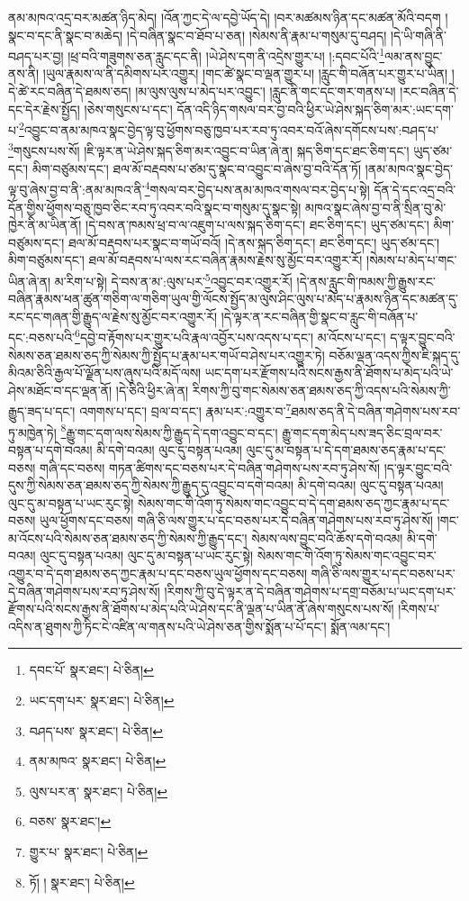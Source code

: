 ནམ་མཁའ་འདྲ་བར་མཚན་ཉིད་མེད། །འོན་ཀྱང་དེ་ལ་དབྱེ་ཡོད་དེ། །བར་མཚམས་ཉིན་དང་མཚན་མོའི་བདག །སྣང་བ་དང་ནི་སྣང་བ་མཆེད། །དེ་བཞིན་སྣང་བ་ཐོབ་པ་ཅན། །སེམས་ནི་རྣམ་པ་གསུམ་དུ་བཤད། །དེ་ཡི་གཞི་ནི་བཤད་པར་བྱ། །ཕྲ་བའི་གཟུགས་ཅན་རླུང་དང་ནི། །ཡེ་ཤེས་དག་ནི་འདྲེས་གྱུར་པ། །:དབང་པོའི་\footnote{དབང་པོ་  སྣར་ཐང་།  པེ་ཅིན། }ལམ་ནས་བྱུང་ནས་ནི། །ཡུལ་རྣམས་ལ་ནི་དམིགས་པར་འགྱུར། །གང་ཚེ་སྣང་བ་ལྡན་གྱུར་པ། །རླུང་གི་བཞོན་པར་གྱུར་པ་ཡིན། །དེ་ཚེ་རང་བཞིན་དེ་ཐམས་ཅད། །མ་ལུས་ལུས་པ་མེད་པར་འབྱུང་། །རླུང་ནི་གང་དང་གར་གནས་པ། །རང་བཞིན་དེ་དང་དེར་རྗེས་སྤྱོད། །ཅེས་གསུངས་པ་དང་། དོན་འདི་ཉིད་གསལ་བར་བྱ་བའི་ཕྱིར་ཡེ་ཤེས་སྐད་ཅིག་མར་:ཡང་དག་པ་\footnote{ཡང་དག་པར་  སྣར་ཐང་།  པེ་ཅིན། }འབྱུང་བ་ནམ་མཁའ་སྣང་བྱེད་ལྟ་བུ་ཕྱོགས་བཅུ་ཁྱབ་པར་རབ་ཏུ་འབར་བའོ་ཞེས་དགོངས་པས་:བཤད་པ་\footnote{བཤད་པས་  སྣར་ཐང་།  པེ་ཅིན། }གསུངས་པས་སོ། །ཇི་ལྟར་ན་ཡེ་ཤེས་སྐད་ཅིག་མར་འབྱུང་བ་ཡིན་ཞེ་ན། སྐད་ཅིག་དང་ཐང་ཅིག་དང་། ཡུད་ཙམ་དང་། མིག་བཙུམས་དང་། ཐལ་མོ་བརྡབས་པ་ཙམ་དུ་སྣང་བ་འབྱུང་བ་ཞེས་བྱ་བའི་དོན་ཏོ། །ནམ་མཁའ་སྣང་བྱེད་ལྟ་བུ་ཞེས་བྱ་བ་ནི་:ནམ་མཁའ་ནི་\footnote{ནམ་མཁའ་  སྣར་ཐང་།  པེ་ཅིན། }གསལ་བར་བྱེད་པས་ནམ་མཁའ་གསལ་བར་བྱེད་པ་སྟེ། དོན་དེ་དང་འདྲ་བའི་དོན་གྱིས་ཕྱོགས་བཅུ་ཁྱབ་ཅིང་རབ་ཏུ་འབར་བའི་སྣང་བ་གསུམ་དུ་སྣང་སྟེ། མཁའ་སྣང་ཞེས་བྱ་བ་ནི་སྲིན་བུ་མེ་ཁྱེར་ནི་མ་ཡིན་ནོ། །དེ་བས་ན་ཁམས་ཕྲ་བ་ལ་འཇུག་པ་ལས་སྐད་ཅིག་དང་། ཐང་ཅིག་དང་། ཡུད་ཙམ་དང་། མིག་བཙུམས་དང་། ཐལ་མོ་བརྡབས་པར་སྣང་བ་གཡོ་བའོ། །དེ་ནས་སྐད་ཅིག་དང་། ཐང་ཅིག་དང་། ཡུད་ཙམ་དང་། མིག་བཙུམས་དང་། ཐལ་མོ་བརྡབས་པ་ལས་རང་བཞིན་རྣམས་རྗེས་སུ་མྱོང་བར་འགྱུར་རོ། །སེམས་པ་མེད་པ་གང་ཡིན་ཞེ་ན། མ་རིག་པ་སྟེ། དེ་བས་ན་མ་:ལུས་པར་\footnote{ལུས་པར་ན་  སྣར་ཐང་།  པེ་ཅིན། }འབྱུང་བར་འགྱུར་རོ། །དེ་ནས་རླུང་གི་ཁམས་ཀྱི་རྒྱུས་རང་བཞིན་རྣམས་ཕན་ཚུན་གཅིག་ལ་གཅིག་ཡུལ་གྱི་ལོངས་སྤྱོད་མ་ལུས་ཤིང་ལུས་པ་མེད་པ་རྣམས་ཉིན་དང་མཚན་དུ་རང་དང་གཞན་གྱི་རྒྱུད་ལ་རྗེས་སུ་མྱོང་བར་འགྱུར་རོ། །དེ་ལྟར་ན་རང་བཞིན་གྱི་སྣང་བ་རླུང་གི་བཞོན་པ་དང་:བཅས་པའི་\footnote{བཅས་  སྣར་ཐང་། }དབྱེ་བ་རྟོགས་པར་གྱུར་པའི་རྣལ་འབྱོར་པས་འདས་པ་དང་། མ་འོངས་པ་དང་། ད་ལྟར་བྱུང་བའི་སེམས་ཅན་ཐམས་ཅད་ཀྱི་སེམས་ཀྱི་སྤྱོད་པ་རྣམ་པར་གཡོ་བ་ཤེས་པར་འགྱུར་ཏེ། བཅོམ་ལྡན་འདས་ཀྱིས་ཇི་སྐད་དུ་མིའམ་ཅིའི་རྒྱལ་པོ་ལྗོན་པས་ཞུས་པའི་མདོ་ལས། ཡང་དག་པར་རྫོགས་པའི་སངས་རྒྱས་ནི་ཐོགས་པ་མེད་པའི་ཡེ་ཤེས་མཐོང་བ་དང་ལྡན་ནོ། །དེ་ཅིའི་ཕྱིར་ཞེ་ན། རིགས་ཀྱི་བུ་གང་སེམས་ཅན་ཐམས་ཅད་ཀྱི་འདས་པའི་སེམས་ཀྱི་རྒྱུད་ཟད་པ་དང་། འགགས་པ་དང་། བྲལ་བ་དང་། རྣམ་པར་:འགྱུར་བ་\footnote{གྱུར་པ་  སྣར་ཐང་།  པེ་ཅིན། }ཐམས་ཅད་ནི་དེ་བཞིན་གཤེགས་པས་རབ་ཏུ་མཁྱེན་ཏེ། \footnote{ཏོ། །   སྣར་ཐང་།  པེ་ཅིན། }རྒྱུ་གང་དག་ལས་སེམས་ཀྱི་རྒྱུད་དེ་དག་འབྱུང་བ་དང་། རྒྱུ་གང་དག་མེད་པས་ཟད་ཅིང་བྲལ་བར་བསྟན་པ་དགེ་བའམ། མི་དགེ་བའམ། ལུང་དུ་བསྟན་པའམ། ལུང་དུ་མ་བསྟན་པ་དེ་དག་ཐམས་ཅད་རྣམ་པ་དང་བཅས། གཞི་དང་བཅས། གཏན་ཚིགས་དང་བཅས་པར་དེ་བཞིན་གཤེགས་པས་རབ་ཏུ་ཤེས་སོ། །ད་ལྟར་བྱུང་བའི་དུས་ཀྱི་སེམས་ཅན་ཐམས་ཅད་ཀྱི་སེམས་ཀྱི་རྒྱུད་དུ་འབྱུང་བ་དགེ་བའམ། མི་དགེ་བའམ། ལུང་དུ་བསྟན་པའམ། ལུང་དུ་མ་བསྟན་པ་ཡང་རུང་སྟེ། སེམས་གང་གི་འོག་ཏུ་སེམས་གང་འབྱུང་བ་དེ་དག་ཐམས་ཅད་ཀྱང་རྣམ་པ་དང་བཅས། ཡུལ་ཕྱོགས་དང་བཅས། གཞི་ཅི་ལས་གྱུར་པ་དང་བཅས་པར་དེ་བཞིན་གཤེགས་པས་རབ་ཏུ་ཤེས་སོ། །གང་མ་འོངས་པའི་སེམས་ཅན་ཐམས་ཅད་ཀྱི་སེམས་ཀྱི་རྒྱུད་དང་། སེམས་ལས་བྱུང་བའི་ཆོས་དགེ་བའམ། མི་དགེ་བའམ། ལུང་དུ་བསྟན་པའམ། ལུང་དུ་མ་བསྟན་པ་ཡང་རུང་སྟེ། སེམས་གང་གི་འོག་ཏུ་སེམས་གང་འབྱུང་བར་འགྱུར་བ་དེ་དག་ཐམས་ཅད་ཀྱང་རྣམ་པ་དང་བཅས་ཡུལ་ཕྱོགས་དང་བཅས། གཞི་ཅི་ལས་གྱུར་པ་དང་བཅས་པར་དེ་བཞིན་གཤེགས་པས་རབ་ཏུ་ཤེས་སོ། །རིགས་ཀྱི་བུ་དེ་ལྟར་ན་དེ་བཞིན་གཤེགས་པ་དགྲ་བཅོམ་པ་ཡང་དག་པར་རྫོགས་པའི་སངས་རྒྱས་ནི་ཐོགས་པ་མེད་པའི་ཡེ་ཤེས་དང་ནི་ལྡན་པ་ཡིན་ནོ་ཞེས་གསུངས་པས་སོ། །རིགས་པ་འདིས་ན་ཐུགས་ཀྱི་ཏིང་ངེ་འཛིན་ལ་གནས་པའི་ཡེ་ཤེས་ཅན་གྱིས་སྨོན་པ་པོ་དང་། སྨོན་ལམ་དང་། 